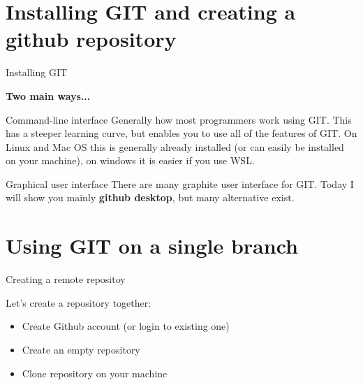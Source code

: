 \documentclass[c,11pt,xcolor=dvipsnames, aspectratio=169]{beamer}
\begin{document}
\section{Installing GIT and creating a github repository}

\begin{frame}{Installing GIT}

\textbf{Two main ways...}

\begin{block}{Command-line interface}
Generally how most programmers work using GIT. This has a steeper learning curve, but enables you to use all of the features of GIT. On Linux and Mac OS this is generally already installed (or can easily be installed on your machine), on windows it is easier if you use WSL.
\end{block}

\begin{block}{Graphical user interface}
There are many graphite user interface for GIT. Today I will show you mainly \textbf{github desktop}, but many alternative exist.
\end{block}


\end{frame}



\section{Using GIT on a single branch}

\begin{frame}{Creating a remote repositoy}

	Let's create a repository together:
	\begin{itemize}
	\item Create Github account (or login to existing one)
	\item Create an empty repository
	\item Clone repository on your machine
	\end{itemize}
\end{frame}
\end{document}
